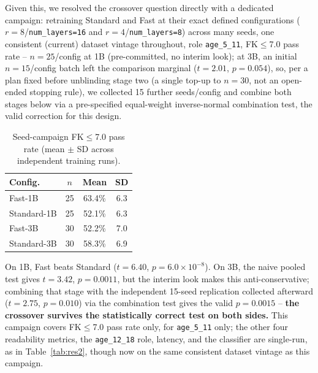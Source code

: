 \documentclass[pdflatex,sn-mathphys-num]{sn-jnl}%
\begin{document}
Given this, we resolved the crossover question directly with a dedicated campaign: retraining Standard and Fast at their exact defined configurations ($r=8$/\texttt{num\_layers=16} and $r=4$/\texttt{num\_layers=8}) across many seeds, one consistent (current) dataset vintage throughout, role \texttt{age\_5\_11}, FK$\leq$7.0 pass rate -- $n=25$/config at 1B (pre-committed, no interim look); at 3B, an initial $n=15$/config batch left the comparison marginal ($t=2.01$, $p=0.054$), so, per a plan fixed before unblinding stage two (a single top-up to $n=30$, not an open-ended stopping rule), we collected 15 further seeds/config and combine both stages below via a pre-specified equal-weight inverse-normal combination test, the valid correction for this design.

\begin{table}[!h]
  \centering
  \caption{Seed-campaign FK$\leq$7.0 pass rate (mean $\pm$ SD across independent training runs).}
  \label{tab:seedcampaign}
  \small
  \begin{tabular}{@{}lccc@{}}
    \toprule
    Config. & $n$ & Mean & SD \\
    \midrule
    Fast-1B     & 25 & 63.4\% & 6.3 \\
    Standard-1B & 25 & 52.1\% & 6.3 \\
    Fast-3B     & 30 & 52.2\% & 7.0 \\
    Standard-3B & 30 & 58.3\% & 6.9 \\
    \bottomrule
  \end{tabular}
\end{table}

On 1B, Fast beats Standard ($t=6.40$, $p=6.0\times10^{-8}$). On 3B, the naive pooled test gives $t=3.42$, $p=0.0011$, but the interim look makes this anti-conservative; combining that stage with the independent 15-seed replication collected afterward ($t=2.75$, $p=0.010$) via the combination test gives the valid $p=0.0015$ -- \textbf{the crossover survives the statistically correct test on both sides.} This campaign covers FK$\leq$7.0 pass rate only, for \texttt{age\_5\_11} only; the other four readability metrics, the \texttt{age\_12\_18} role, latency, and the classifier are single-run, as in Table~\ref{tab:res2}, though now on the same consistent dataset vintage as this campaign.
\end{document}
